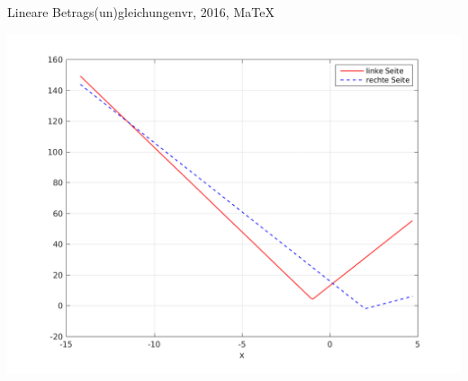 \begin{MAufgabe}{Lineare Betrags(un)gleichungen}{vr, 2016, MaTeX}
 \begin{center}
 \includegraphics[width=0.8\linewidth]{Abb_zur_Ag_autogenerated_abs_2.png} \end{center}
 
\else\relax\fi
 \end{MAufgabe}